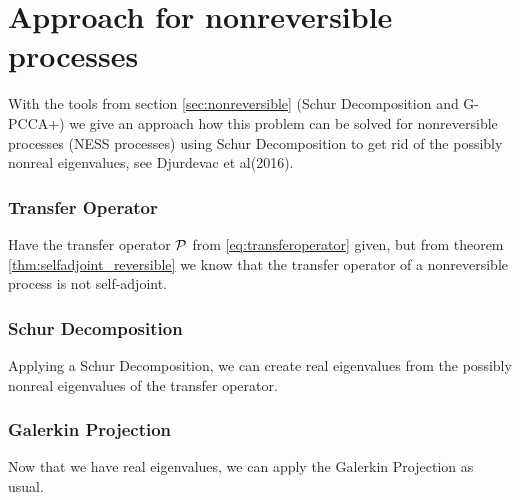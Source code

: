 \section{Approach for nonreversible processes}
\label{sec:rebinding_nonreversible}

With the tools from section \ref{sec:nonreversible} (Schur Decomposition and G-PCCA+) we give an approach how this problem can be solved
for nonreversible processes (NESS processes) using Schur Decomposition to get rid of the possibly nonreal eigenvalues, see Djurdevac et al\cite{djur2016}(2016).

\subsubsection*{Transfer Operator}
Have the transfer operator $\mathcal{P}$ from \eqref{eq:transferoperator} given, but from theorem \ref{thm:selfadjoint_reversible} we know that the transfer operator of a nonreversible process is not self-adjoint.

\subsubsection*{Schur Decomposition}
Applying a Schur Decomposition, we can create real eigenvalues from the possibly nonreal eigenvalues of the transfer operator.

\subsubsection*{Galerkin Projection}
Now that we have real eigenvalues, we can apply the Galerkin Projection as usual. 
